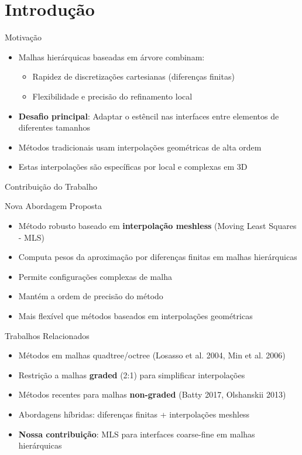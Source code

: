 \documentclass[../main/main.tex]{subfiles}
\begin{document}
\section{Introdução}

\begin{frame}{Motivação}
\begin{itemize}
\item Malhas hierárquicas baseadas em árvore combinam:
\begin{itemize}
\item Rapidez de discretizações cartesianas (diferenças finitas)
\item Flexibilidade e precisão do refinamento local
\end{itemize}
\item \textbf{Desafio principal}: Adaptar o estêncil nas interfaces entre elementos de diferentes tamanhos
\item Métodos tradicionais usam interpolações geométricas de alta ordem
\item Estas interpolações são específicas por local e complexas em 3D
\end{itemize}
\end{frame}

\begin{frame}{Contribuição do Trabalho}
\begin{block}{Nova Abordagem Proposta}
\begin{itemize}
\item Método robusto baseado em \textbf{interpolação meshless} (Moving Least Squares - MLS)
\item Computa pesos da aproximação por diferenças finitas em malhas hierárquicas
\item Permite configurações complexas de malha
\item Mantém a ordem de precisão do método
\item Mais flexível que métodos baseados em interpolações geométricas
\end{itemize}
\end{block}
\end{frame}

\begin{frame}{Trabalhos Relacionados}
\begin{itemize}
\item Métodos em malhas quadtree/octree (Losasso et al. 2004, Min et al. 2006)
\item Restrição a malhas \textbf{graded} (2:1) para simplificar interpolações
\item Métodos recentes para malhas \textbf{non-graded} (Batty 2017, Olshanskii 2013)
\item Abordagens híbridas: diferenças finitas + interpolações meshless
\item \textbf{Nossa contribuição}: MLS para interfaces coarse-fine em malhas hierárquicas
\end{itemize}
\end{frame}
\end{document}
